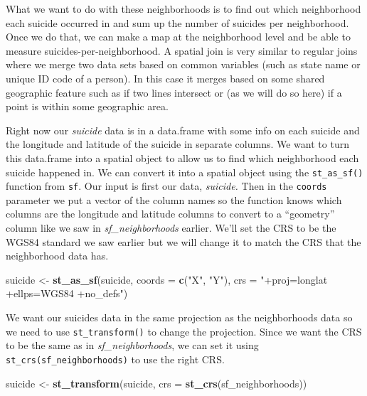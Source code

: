 \documentclass[
  12pt,
]{book}
\newenvironment{Shaded}{\begin{snugshade}}{\end{snugshade}}
\newcommand{\DataTypeTok}[1]{\textcolor[rgb]{0.27,0.27,0.27}{#1}}
\newcommand{\KeywordTok}[1]{\textcolor[rgb]{0.27,0.27,0.27}{\textbf{#1}}}
\newcommand{\NormalTok}[1]{#1}
\newcommand{\StringTok}[1]{\textcolor[rgb]{0.5,0.5,0.5}{#1}}
\begin{document}
What we want to do with these neighborhoods is to find out which neighborhood each suicide occurred in and sum up the number of suicides per neighborhood. Once we do that, we can make a map at the neighborhood level and be able to measure suicides-per-neighborhood. A spatial join is very similar to regular joins where we merge two data sets based on common variables (such as state name or unique ID code of a person). In this case it merges based on some shared geographic feature such as if two lines intersect or (as we will do so here) if a point is within some geographic area.

Right now our \emph{suicide} data is in a data.frame with some info on each suicide and the longitude and latitude of the suicide in separate columns. We want to turn this data.frame into a spatial object to allow us to find which neighborhood each suicide happened in. We can convert it into a spatial object using the \texttt{st\_as\_sf()} function from \texttt{sf}. Our input is first our data, \emph{suicide.} Then in the \texttt{coords} parameter we put a vector of the column names so the function knows which columns are the longitude and latitude columns to convert to a ``geometry'' column like we saw in \emph{sf\_neighborhoods} earlier. We'll set the CRS to be the WGS84 standard we saw earlier but we will change it to match the CRS that the neighborhood data has.

\begin{Shaded}
\begin{Highlighting}[]
\NormalTok{suicide <{-}}\StringTok{ }\KeywordTok{st\_as\_sf}\NormalTok{(suicide, }
                    \DataTypeTok{coords =} \KeywordTok{c}\NormalTok{(}\StringTok{"X"}\NormalTok{, }\StringTok{"Y"}\NormalTok{),}
                    \DataTypeTok{crs =} \StringTok{"+proj=longlat +ellps=WGS84 +no\_defs"}\NormalTok{)}
\end{Highlighting}
\end{Shaded}

We want our suicides data in the same projection as the neighborhoods data so we need to use \texttt{st\_transform()} to change the projection. Since we want the CRS to be the same as in \emph{sf\_neighborhoods}, we can set it using \texttt{st\_crs(sf\_neighborhoods)} to use the right CRS.

\begin{Shaded}
\begin{Highlighting}[]
\NormalTok{suicide <{-}}\StringTok{ }\KeywordTok{st\_transform}\NormalTok{(suicide, }
                        \DataTypeTok{crs =} \KeywordTok{st\_crs}\NormalTok{(sf\_neighborhoods))}
\end{Highlighting}
\end{Shaded}
\end{document}
